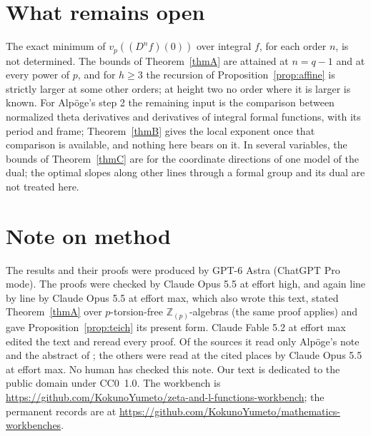 \documentclass[11pt]{amsart}
\newcommand{\workbenchurl}{https://github.com/KokunoYumeto/zeta-and-l-functions-workbench}
\newcommand{\recordurl}{https://github.com/KokunoYumeto/mathematics-workbenches}
\theoremstyle{definition}
\theoremstyle{remark}
\newcommand{\Z}{\mathbb Z}
\newcommand{\vp}{v_p}
\begin{document}
\section{What remains open}
The exact minimum of $\vp((D^nf)(0))$ over integral $f$, for each order $n$, is not determined. The bounds of Theorem~\ref{thmA} are attained at $n=q-1$ and at every power of $p$, and for $h\ge3$ the recursion of Proposition~\ref{prop:affine} is strictly larger at some other orders; at height two no order where it is larger is known. For Alp\"oge's step 2 the remaining input is the comparison between normalized theta derivatives and derivatives of integral formal functions, with its period and frame; Theorem~\ref{thmB} gives the local exponent once that comparison is available, and nothing here bears on it. In several variables, the bounds of Theorem~\ref{thmC} are for the coordinate directions of one model of the dual; the optimal slopes along other lines through a formal group and its dual are not treated here.

\section*{Note on method}
The results and their proofs were produced by GPT-6 Astra (ChatGPT Pro mode). The proofs were checked by Claude Opus 5.5 at effort high, and again line by line by Claude Opus 5.5 at effort max, which also wrote this text, stated Theorem~\ref{thmA} over $p$-torsion-free $\Z_{(p)}$-algebras (the same proof applies) and gave Proposition~\ref{prop:teich} its present form. Claude Fable 5.2 at effort max edited the text and reread every proof. Of the sources it read only Alp\"oge's note and the abstract of \cite{Three}; the others were read at the cited places by Claude Opus 5.5 at effort max. No human has checked this note. Our text is dedicated to the public domain under CC0~1.0. The workbench is \expandafter\url\expandafter{\workbenchurl}; the permanent records are at \expandafter\url\expandafter{\recordurl}.
\end{document}

